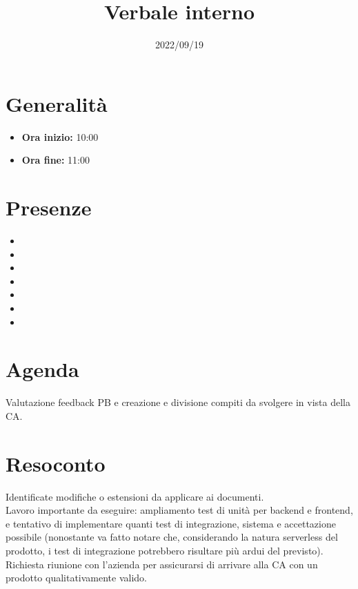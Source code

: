 \documentclass{classes/base}
\title{Verbale interno}
\date{2022/09/19}
\author{\marcob}
\renewcommand{\maketitle}{
    
}
\begin{document}
    \maketitle

    \section*{Generalità}
    \begin{itemize}
        \item \textbf{Ora inizio:} 10:00
        \item \textbf{Ora fine:} 11:00
    \end{itemize}

    \section*{Presenze}
    \begin{itemize}
    	\item \angela
        \item \marcob
        \item \matteo
        \item \marcov
        \item \giulio
        \item \ruth
        \item \tommaso
    \end{itemize}

    \section*{Agenda}
    Valutazione feedback PB e creazione e divisione compiti da svolgere in vista della CA.

    \section*{Resoconto}
    Identificate modifiche o estensioni da applicare ai documenti.\\
    Lavoro importante da eseguire: ampliamento test di unità per backend e frontend, e tentativo di
    implementare quanti test di integrazione, sistema e accettazione possibile (nonostante va
    fatto notare che, considerando la natura serverless del prodotto, i test di integrazione
    potrebbero risultare più ardui del previsto).\\
    Richiesta riunione con l'azienda per assicurarsi di arrivare alla CA con un prodotto qualitativamente valido.
\end{document}
